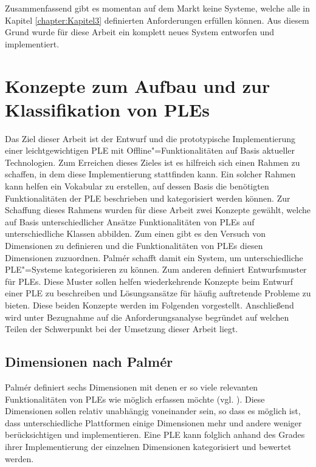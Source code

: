 Zusammenfassend gibt es momentan auf dem Markt keine Systeme, welche alle in Kapitel \ref{chapter:Kapitel3} definierten Anforderungen erfüllen können. Aus diesem Grund wurde für diese Arbeit ein komplett neues System entworfen und implementiert.

\section{Konzepte zum Aufbau und zur Klassifikation von \acp{PLE}}
Das Ziel dieser Arbeit ist der Entwurf und die prototypische Implementierung einer leichtgewichtigen \ac{PLE} mit Offline"=Funktionalitäten auf Basis aktueller Technologien. Zum Erreichen dieses Zieles ist es hilfreich sich einen Rahmen zu schaffen, in dem diese Implementierung stattfinden kann. Ein solcher Rahmen kann helfen ein Vokabular zu erstellen, auf dessen Basis die benötigten Funktionalitäten der \ac{PLE} beschrieben und kategorisiert werden können. Zur Schaffung dieses Rahmens wurden für diese Arbeit zwei Konzepte gewählt, welche auf Basis unterschiedlicher Ansätze Funktionalitäten von \acp{PLE} auf unterschiedliche Klassen abbilden. Zum einen gibt es den Versuch von \cite{Palmer2009} Dimensionen zu definieren und die Funktionalitäten von \acp{PLE} diesen Dimensionen zuzuordnen. Palmér schafft damit ein System, um unterschiedliche \ac{PLE}"=Systeme kategorisieren zu können. Zum anderen definiert \cite{Wilson2008} Entwurfsmuster für \acp{PLE}. Diese Muster sollen helfen wiederkehrende Konzepte beim Entwurf einer \ac{PLE} zu beschreiben und Lösungsansätze für häufig auftretende Probleme zu bieten. Diese beiden Konzepte werden im Folgenden vorgestellt. Anschließend wird unter Bezugnahme auf die Anforderungsanalyse begründet auf welchen Teilen der Schwerpunkt bei der Umsetzung dieser Arbeit liegt.

\subsection{Dimensionen nach Palmér}\label{section:dimensions_palmer} 
Palmér definiert sechs Dimensionen mit denen er so viele relevanten Funktionalitäten von \acp{PLE} wie möglich erfassen möchte (vgl. \cite{Palmer2009}). Diese Dimensionen sollen relativ unabhängig voneinander sein, so dass es möglich ist, dass unterschiedliche Plattformen einige Dimensionen mehr und andere weniger berücksichtigen und implementieren. Eine \ac{PLE} kann folglich anhand des Grades ihrer Implementierung der einzelnen Dimensionen kategorisiert und bewertet werden.


